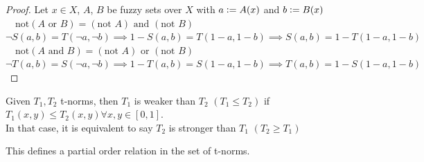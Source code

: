 \begin{proof}
  Let $x\in X$, $A$, $B$ be fuzzy sets over $X$ with $a \mathrel{\mathop:}= A(x)$ and $b \mathrel{\mathop:}= B(x)$\\

  $\quad \boxed{\text{not}(A \text{ or } B) = (\text{not } A) \text{ and } (\text{not } B)}$\\[0.5em]
  $\lnot S(a,b) = T(\lnot a, \lnot b) \implies 1 - S(a,b) = T(1-a, 1-b) \implies S(a,b) = 1 - T(1-a, 1-b)$\\

  $\quad \boxed{\text{not}(A \text{ and } B) = (\text{not } A) \text{ or } (\text{not } B)}$\\[0.5em]
  $\lnot T(a,b) = S(\lnot a, \lnot b) \implies 1 - T(a,b) = S(1-a, 1-b) \implies T(a,b) = 1 - S(1-a, 1-b)$

\end{proof}

\signal{
\begin{definition}[Archimedean t-norm]
  A continuous t-norm that satisfies $T(x,x)<x \forall x\in ]0,1[$ is called an archimedean t-norm.
\end{definition}

\begin{proposition}[Characterization of archimedean t-norms]
  For all archimedean t-norms there exists a continuous decreasing function $f:[0,1] \longrightarrow [0,\infty[$ with $f(1)=0$ such that: 
  \[ 
  T(x,y)= f^{-1}(\min\{f(x)+f(y), f(0)\}) \text{ where } f^{-1} =
  \begin{cases}
    f^{-1}(y) & \text{if } y\in [0,f(0) ]\\
    0 & \text{otherwise}
  \end{cases}
  \text{ is a pseudo-inverse}.
  \]
\end{proposition}
}


\begin{definition}
  Given $T_1, T_2$ t-norms, then $T_1$ is weaker than $T_2$ $(T_1 \leq T_2)$ if $T_1(x,y)\leq T_2(x,y)\forall x,y\in [0,1]$.\\
  In that case, it is equivalent to say $T_2$ is stronger than $T_1$ $(T_2 \geq T_1)$

\end{definition}
\begin{remark}
  This defines a partial order relation in the set of t-norms.
\end{remark}

